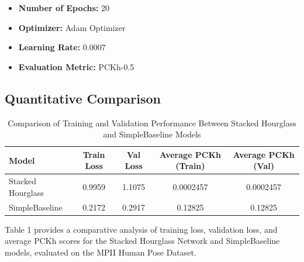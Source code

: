 \documentclass{article}
\begin{document}
\begin{itemize}
\item \textbf{Number of Epochs:} 20
\item  \textbf{Optimizer:} Adam Optimizer
\item  \textbf{Learning Rate:} 0.0007
\item  \textbf{Evaluation Metric:} PCKh-0.5
\end{itemize}

\subsection{Quantitative Comparison}

\begin{table}[htpb]
    \centering
    \caption{Comparison of Training and Validation Performance Between Stacked Hourglass and SimpleBaseline Models}
    \label{tab:model_comparison}
    \begin{tabular}{|l|c|c|c|c|}
        \hline
        \textbf{Model} & \textbf{Train Loss} & \textbf{Val Loss} & \textbf{Average PCKh (Train)} & \textbf{Average PCKh (Val)} \\ \hline
        Stacked Hourglass & 0.9959 & 1.1075 & 0.0002457 & 0.0002457 \\ \hline
        SimpleBaseline    & 0.2172 & 0.2917 & 0.12825   & 0.12825   \\ \hline
    \end{tabular}
\end{table}
Table 1 provides a comparative analysis of training loss, validation loss, and average PCKh scores for the Stacked Hourglass Network and SimpleBaseline models, evaluated on the MPII Human Pose Dataset.
\end{document}
